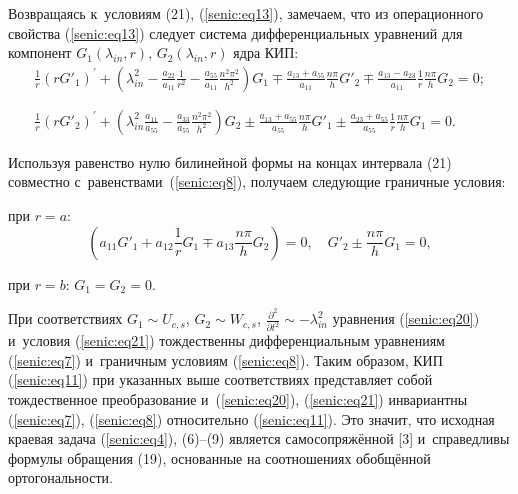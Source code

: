Возвращаясь к~условиям (21), (\ref{senic:eq13}), замечаем, что из операционного свойства 
(\ref{senic:eq13}) следует система дифференциальных уравнений для компонент $G_1 \left( 
\lambda _{in}, r \right)$, $G_2 \left( \lambda _{in}, r \right)$ ядра КИП:
\begin{equation}
\label{senic:eq20}
\begin{array}{l}
\displaystyle
\frac{1}{r}\left( {r{G}'_1 } \right)^\prime + \left( {\lambda _{in}^2 - 
\frac{a_{22} }{a_{11} }\frac{1}{r^2} - \frac{a_{55} }{a_{11} }\frac{n^2\pi 
^2}{h^2}} \right)G_1 \mp \frac{a_{13} + a_{55} }{a_{11} }\frac{n\pi 
}{h}{G}'_2 \mp \frac{a_{13} - a_{23} }{a_{11} }\frac{1}{r}\frac{n\pi }{h}G_2 
= 0;
\\
\displaystyle
\frac{1}{r}\left( {r{G}'_2 } \right)^\prime + \left( {\lambda _{in}^2 
\frac{a_{11} }{a_{55} } - \frac{a_{33} }{a_{55} }\frac{n^2\pi ^2}{h^2}} 
\right)G_2 \pm \frac{a_{13} + a_{55} }{a_{55} }\frac{n\pi }{h}{G}'_1 \pm 
\frac{a_{23} + a_{55} }{a_{55} }\frac{1}{r}\frac{n\pi }{h}G_1 = 0.\phantom{\int\limits^{\frac12}}
\end{array}
\end{equation}



Используя равенство нулю билинейной формы на концах интервала (21) совместно 
с~равенствами~(\ref{senic:eq8}), получаем следующие граничные условия:

\noindent
при $r = a$:
\begin{equation}
\label{senic:eq21}
\left( {a_{11} {G}'_1 + a_{12} \frac{1}{r}G_1 \mp a_{13} \frac{n\pi }{h}G_2 
} \right) = 0,\quad {G}'_2 \pm \frac{n\pi }{h}G_1 = 0,
\end{equation}



\noindent
при $r = b$: $G_1  = G_2 = 0.$

\begin{remark}[3]При соответствиях $G_1 \sim U_{c,s}$, $G_2 \sim W_{c,s}$, $\frac{\partial ^2}{\partial t^2} \sim - \lambda _{in}^2 $ уравнения (\ref{senic:eq20}) и~условия (\ref{senic:eq21}) тождественны дифференциальным уравнениям (\ref{senic:eq7}) и~граничным условиям (\ref{senic:eq8}). 
Таким образом, КИП (\ref{senic:eq11}) при указанных выше соответствиях представляет собой 
тождественное преобразование и~(\ref{senic:eq20}), (\ref{senic:eq21}) инвариантны (\ref{senic:eq7}), (\ref{senic:eq8}) 
относительно (\ref{senic:eq11}). Это значит, что исходная краевая задача (\ref{senic:eq4}), (6)--(9) 
является самосопряжённой [3] и~справедливы формулы обращения (19), основанные на соотношениях обобщённой ортогональности.
\end{remark}


